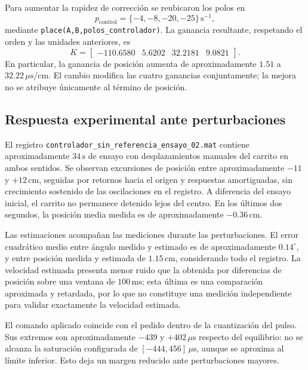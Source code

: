 \documentclass[a4paper, twoside, 10pt, spanish]{article}
\numberwithin{table}{section}
\begin{document}
Para aumentar la rapidez de corrección se reubicaron los polos en
\begin{equation}
    p_{\mathrm{control}} = \{-4,-8,-20,-25\}\,\mathrm{s}^{-1},
\end{equation}
mediante \texttt{place(A,B,polos\_controlador)}. La ganancia resultante, respetando el orden y las unidades anteriores, es
\begin{equation}
    K = \begin{bmatrix}
    -110.6580 & 5.6202 & 32.2181 & 9.0821
    \end{bmatrix}.
\end{equation}
En particular, la ganancia de posición aumenta de aproximadamente $1.51$ a $32.22\,\mu\mathrm{s}/\mathrm{cm}$. El cambio modifica las cuatro ganancias conjuntamente; la mejora no se atribuye únicamente al término de posición.

\subsection{Respuesta experimental ante perturbaciones}
El registro \texttt{controlador\_sin\_referencia\_ensayo\_02.mat} contiene aproximadamente $34\,\mathrm{s}$ de ensayo con desplazamientos manuales del carrito en ambos sentidos. Se observan excursiones de posición entre aproximadamente $-11$ y $+12\,\mathrm{cm}$, seguidas por retornos hacia el origen y respuestas amortiguadas, sin crecimiento sostenido de las oscilaciones en el registro. A diferencia del ensayo inicial, el carrito no permanece detenido lejos del centro. En los últimos dos segundos, la posición media medida es de aproximadamente $-0.36\,\mathrm{cm}$.

Las estimaciones acompañan las mediciones durante las perturbaciones. El error cuadrático medio entre ángulo medido y estimado es de aproximadamente $0.14^\circ$, y entre posición medida y estimada de $1.15\,\mathrm{cm}$, considerando todo el registro. La velocidad estimada presenta menor ruido que la obtenida por diferencias de posición sobre una ventana de $100\,\mathrm{ms}$; esta última es una comparación aproximada y retardada, por lo que no constituye una medición independiente para validar exactamente la velocidad estimada.

El comando aplicado coincide con el pedido dentro de la cuantización del pulso. Sus extremos son aproximadamente $-439$ y $+402\,\mu\mathrm{s}$ respecto del equilibrio: no se alcanza la saturación configurada de $[-444,456]\,\mu\mathrm{s}$, aunque se aproxima al límite inferior. Esto deja un margen reducido ante perturbaciones mayores.
\end{document}
